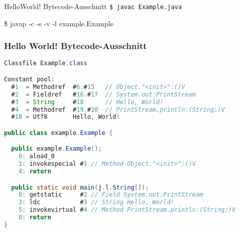 \documentclass[10pt]{beamer}
\begin{document}

\begin{frame}{HelloWorld! Bytecode-Ausschnitt}
\tt{\$ javac Example.java}

{\btt\$ javap -c -s -v -l example.Example}
\end{frame}


\begin{frame}[fragile]
\frametitle{Hello World! Bytecode-Ausschnitt}
\begin{lstlisting}[language=Java]
Classfile Example.class

Constant pool:
  #1  = Methodref  #6.#15   // Object."<init>":()V
  #2  = Fieldref   #16.#17  // System.out:PrintStream
  #3  = String     #18      // Hello, World!
  #4  = Methodref  #19.#20  // PrintStream.println:(String;)V
  #18 = Utf8       Hello, World!

public class example.Example {

  public example.Example();
    0: aload_0       
    1: invokespecial #1 // Method Object."<init>":()V
    4: return        

  public static void main(j.l.String[]);
    0: getstatic     #2 // Field System.out:PrintStream
    3: ldc           #3 // String Hello, World!
    5: invokevirtual #4 // Method PrintStream.println:(String;)V
    8: return        
}
\end{lstlisting}
\end{frame}

\end{document}
